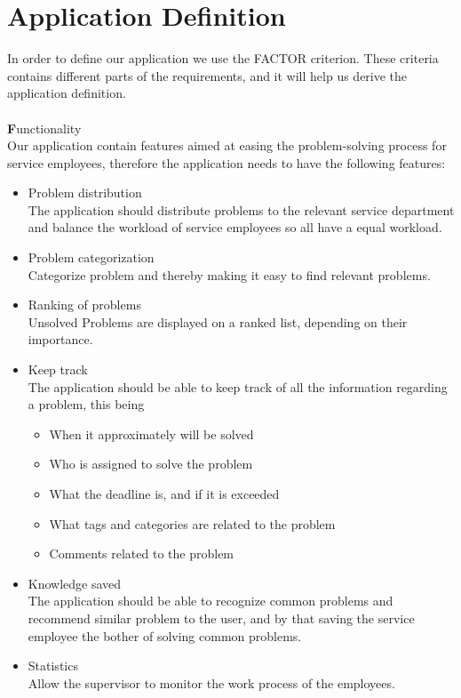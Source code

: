 \section{Application Definition}
\label{sec:factor}
\label{sec:systemdefinition}
In order to define our application we use the FACTOR criterion\cite[p.~39]{roedeaalborg}. These criteria contains different parts of the requirements, and it will help us derive the application definition.  \\
\ \\
{\Large \textbf{F}}unctionality \\
Our application contain features aimed at easing the problem-solving process for service employees, therefore the application needs to have the following features:
\begin{itemize}
\item Problem distribution\\
The application should distribute problems to the relevant service department and balance the workload of service employees so all have a equal workload. 
\item Problem categorization \\
Categorize problem and thereby making it easy to find relevant problems.
\item Ranking of problems \\
Unsolved Problems are displayed on a ranked list, depending on their importance.
\item Keep track \\
The application should be able to keep track of all the information regarding a problem, this being
\begin{itemize}
	\item When it approximately will be solved
	\item Who is assigned to solve the problem
	\item What the deadline is, and if it is exceeded
	\item What tags and categories are related to the problem 
	\item Comments related to the problem
\end{itemize}
\item Knowledge saved \\
The application should be able to recognize common problems and recommend similar problem to the user, and by that saving the service employee the bother of solving common problems. 
\item Statistics \\
Allow the supervisor to monitor the work process of the employees.
\end{itemize}

